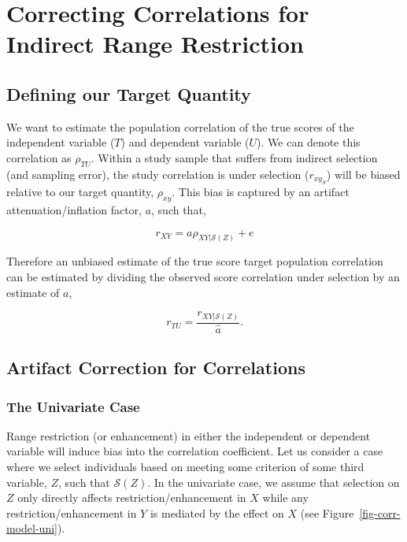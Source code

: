 \documentclass[
  letterpaper,
  DIV=11,
  numbers=noendperiod]{scrreprt}
\begin{document}
\section{Correcting Correlations for Indirect Range
Restriction}\label{correcting-correlations-for-indirect-range-restriction}

\subsection{Defining our Target
Quantity}\label{defining-our-target-quantity-6}

We want to estimate the population correlation of the true scores of the
independent variable (\(T\)) and dependent variable (\(U\)). We can
denote this correlation as \(\rho_{TU}\). Within a study sample that
suffers from indirect selection (and sampling error), the study
correlation is under selection (\(r_{xy_S}\)) will be biased relative to
our target quantity, \(\rho_{xy}\). This bias is captured by an artifact
attenuation/inflation factor, \(a\), such that,

\[
r_{XY} = a \rho_{XY|\mathcal{S}(Z)} + e 
\]

Therefore an unbiased estimate of the true score target population
correlation can be estimated by dividing the observed score correlation
under selection by an estimate of \(a\),

\[
r_{TU} = \frac{ r_{XY|\mathcal{S}(Z)} }{ \hat{a}}.
\]

\subsection{Artifact Correction for
Correlations}\label{artifact-correction-for-correlations}

\subsubsection*{The Univariate Case}\label{the-univariate-case-2}

Range restriction (or enhancement) in either the independent or
dependent variable will induce bias into the correlation coefficient.
Let us consider a case where we select individuals based on meeting some
criterion of some third variable, \(Z\), such that \(\mathcal{S}(Z)\).
In the univariate case, we assume that selection on \(Z\) only directly
affects restriction/enhancement in \(X\) while any
restriction/enhancement in \(Y\) is mediated by the effect on \(X\) (see
Figure~\ref{fig-corr-model-uni}).
\end{document}
